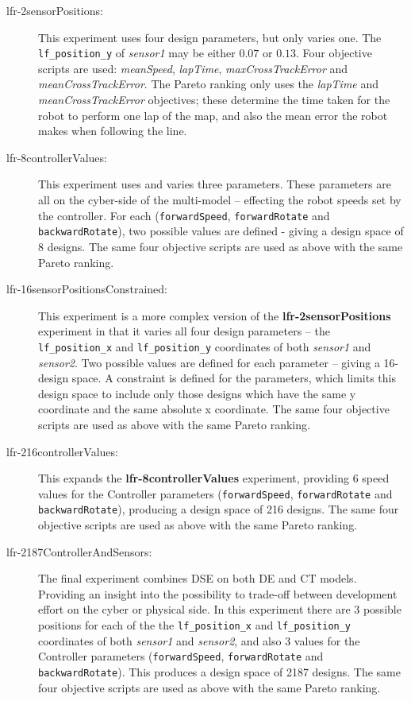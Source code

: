 \begin{description}
   \item[lfr-2sensorPositions:] This experiment uses four design parameters, but only varies one. The \texttt{lf\_position\_y} of \emph{sensor1} may be either $0.07$ or $0.13$. Four objective scripts are used: \emph{meanSpeed}, \emph{lapTime}, \emph{maxCrossTrackError} and \emph{meanCrossTrackError}. The Pareto ranking only uses the \emph{lapTime} and \emph{meanCrossTrackError} objectives; these determine the time taken for the robot to perform one lap of the map, and also the mean error the robot makes when following the line. 
   
   \item[lfr-8controllerValues:] This experiment uses and varies three parameters. These parameters are all on the cyber-side of the multi-model -- effecting the robot speeds set by the controller. For each (\texttt{forwardSpeed}, \texttt{forwardRotate} and \texttt{backwardRotate}), two possible values are defined - giving a design space of 8 designs. The same four objective scripts are used as above with the same Pareto ranking.
   
   \item[lfr-16sensorPositionsConstrained:] This experiment is a more complex version of the \textbf{lfr-2sensorPositions} experiment in that it varies all four design parameters -- the \texttt{lf\_position\_x} and \texttt{lf\_position\_y} coordinates of both \emph{sensor1} and \emph{sensor2}. Two possible values are defined for each parameter -- giving a 16-design space. A constraint is defined for the parameters, which limits this design space to include only those designs which have the same y coordinate and the same absolute x coordinate. The same four objective scripts are used as above with the same Pareto ranking.
   
   \item[lfr-216controllerValues:] This expands the \textbf{lfr-8controllerValues} experiment, providing 6 speed values for the Controller parameters (\texttt{forwardSpeed}, \texttt{forwardRotate} and \texttt{backwardRotate}), producing a design space of 216 designs. The same four objective scripts are used as above with the same Pareto ranking.
   
   \item[lfr-2187ControllerAndSensors:] The final experiment combines DSE on both DE and CT models. Providing an insight into the possibility to trade-off between development effort on the cyber or physical side. In this experiment there are 3 possible positions for each of the the \texttt{lf\_position\_x} and \texttt{lf\_position\_y} coordinates of both \emph{sensor1} and \emph{sensor2}, and also 3 values for the  Controller parameters (\texttt{forwardSpeed}, \texttt{forwardRotate} and \texttt{backwardRotate}). This produces a design space of 2187 designs. The same four objective scripts are used as above with the same Pareto ranking.
   
\end{description}

